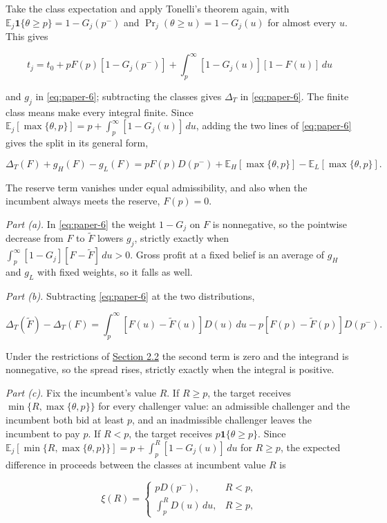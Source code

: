 Take the class expectation and apply Tonelli's theorem again, with
\(\mathbb E_j\mathbf1\{\theta\ge p\}=1-G_j(p^-)\) and
\(\Pr_j(\theta\ge u)=1-G_j(u)\) for almost every \(u\). This gives

\[
t_j=t_0+pF(p)[1-G_j(p^-)]+\int_p^\infty[1-G_j(u)][1-F(u)]\,du
\]

and \(g_j\) in \eqref{eq:paper-6}; subtracting the classes gives
\(\Delta_T\) in \eqref{eq:paper-6}. The finite class means make every
integral finite. Since
\(\mathbb E_j[\max\{\theta,p\}]=p+\int_p^\infty[1-G_j(u)]\,du\), adding
the two lines of \eqref{eq:paper-6} gives the split in its general form,

\[
\Delta_T(F)+g_H(F)-g_L(F)
=pF(p)D(p^-)+\mathbb E_H[\max\{\theta,p\}]-\mathbb E_L[\max\{\theta,p\}].
\]

The reserve term vanishes under equal admissibility, and also when the
incumbent always meets the reserve, \(F(p)=0\).

\emph{Part (a).} In \eqref{eq:paper-6} the weight \(1-G_j\) on \(F\) is
nonnegative, so the pointwise decrease from \(F\) to \(\tilde F\) lowers
\(g_j\), strictly exactly when
\(\int_p^\infty[1-G_j][F-\tilde F]\,du>0\). Gross profit at a fixed
belief is an average of \(g_H\) and \(g_L\) with fixed weights, so it
falls as well.

\emph{Part (b).} Subtracting \eqref{eq:paper-6} at the two
distributions,

\[
\Delta_T(\tilde F)-\Delta_T(F)
=\int_p^\infty[F(u)-\tilde F(u)]D(u)\,du-p[F(p)-\tilde F(p)]D(p^-).
\]

Under the restrictions of
\hyperref[sec-values-preparation-and-the-sale]{Section 2.2} the second
term is zero and the integrand is nonnegative, so the spread rises,
strictly exactly when the integral is positive.

\emph{Part (c).} Fix the incumbent's value \(R\). If \(R\ge p\), the
target receives \(\min\{R,\max\{\theta,p\}\}\) for every challenger
value: an admissible challenger and the incumbent both bid at least
\(p\), and an inadmissible challenger leaves the incumbent to pay \(p\).
If \(R<p\), the target receives \(p\mathbf1\{\theta\ge p\}\). Since
\(\mathbb E_j[\min\{R,\max\{\theta,p\}\}]=p+\int_p^R[1-G_j(u)]\,du\)
for \(R\ge p\), the expected difference in proceeds between the classes
at incumbent value \(R\) is

\[
\xi(R)=
\begin{cases}
pD(p^-), & R<p,\\[3pt]
\int_p^RD(u)\,du, & R\ge p,
\end{cases}
\]


